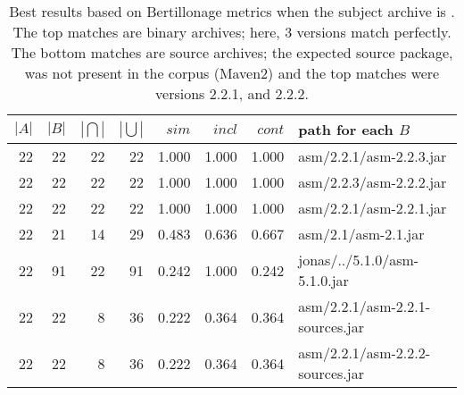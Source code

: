 \begin{table}[htbp]
\small
  \centering
  \begin{tabular}{r|r|r|r|r|r|r|l}
 $|A|$ & $|B|$&$|\bigcap |$ & $| \bigcup |$ & $sim$  &
 $incl$& $cont$ & path for each $B$ \\
\hline
  22 &   22 &            22 &        22 &  1.000  &  1.000    &  1.000    & asm/2.2.1/asm-2.2.3.jar\\
  22 &   22 &            22 &        22 &  1.000  &  1.000    &  1.000    & asm/2.2.3/asm-2.2.2.jar\\
  22 &   22 &            22 &        22 &  1.000  &  1.000    &  1.000    & asm/2.2.1/asm-2.2.1.jar\\
  22 &   21 &            14 &        29 &  0.483  &  0.636    &  0.667    & asm/2.1/asm-2.1.jar\\
  22 &   91 &            22 &        91 &  0.242  &  1.000    &  0.242    & jonas/../5.1.0/asm-5.1.0.jar\\
\hline
  22 &   22 &             8 &        36 &  0.222  &  0.364    &  0.364    & asm/2.2.1/asm-2.2.1-sources.jar\\
  22 &   22 &             8 &        36 &  0.222  &  0.364    &  0.364    & asm/2.2.1/asm-2.2.2-sources.jar\\
  \end{tabular}
  \vspace{1mm}
  \caption{Best results based on Bertillonage metrics when the
    subject archive  is . The top matches are binary
    archives; here, 3 versions match perfectly. The bottom matches are
    source archives; the expected source package,
     was not present in the corpus (Maven2) and
    the top matches were versions 2.2.1, and 2.2.2.}
  \label{tab:metricsExample}
\end{table}

